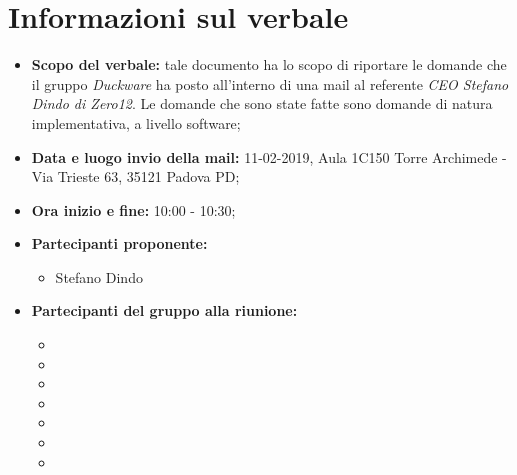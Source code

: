 \clearpage
\section{Informazioni sul verbale}
\begin{itemize}
	\item \textbf {Scopo del verbale:} tale documento ha lo scopo di riportare le domande che il gruppo \emph{Duckware} ha posto all'interno di una mail al referente \emph{CEO Stefano Dindo di Zero12}. Le domande che sono state fatte sono domande di natura implementativa, a livello software;
	\item \textbf {Data e luogo invio della mail:} 11-02-2019, Aula 1C150 Torre Archimede - Via Trieste 63, 35121 Padova PD;
	\item \textbf {Ora inizio e fine:} 10:00 - 10:30;
	\item \textbf {Partecipanti proponente:} 
		\begin{itemize}
			\item Stefano Dindo
		\end{itemize}
	\item \textbf {Partecipanti del gruppo alla riunione:} 
		 \begin{itemize}
			\item \sonia
			\item \luca
			\item \matteo
			\item \pardeep
			\item \alberto
			\item \alessandro
			\item \andrea
		\end{itemize}
\end{itemize}